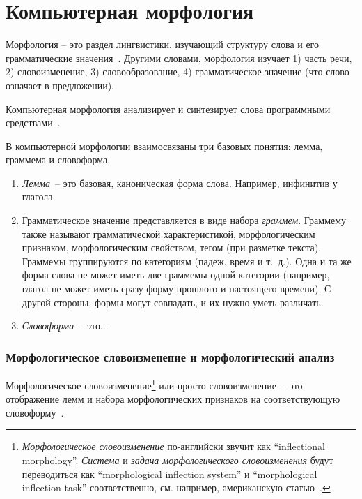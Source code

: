 \section{Компьютерная морфология}\label{sect_review_comp_morphology}

Морфология -- это раздел лингвистики, изучающий структуру слова и его грамматические значения~\cite{MitreninaNikolaevLando2016}. Другими словами, морфология изучает
1) часть речи,
2) словоизменение,
3) словообразование,
4) грамматическое значение (что слово означает в предложении). 

Компьютерная морфология анализирует и синтезирует слова программными средствами~\cite{MitreninaNikolaevLando2016}. 

В компьютерной морфологии взаимосвязаны три базовых понятия: лемма, граммема и словоформа.
\begin{enumerate}
    \item \emph{Лемма}~-- это базовая, каноническая форма слова. 
        Например, инфинитив у глагола.

    \item Грамматическое значение представляется в виде набора \emph{граммем}. 
        Граммему также называют грамматической характеристикой, 
          морфологическим признаком, морфологическим свойством, 
          тегом (при разметке текста). 
        Граммемы группируются по категориям (падеж, время и т.~д.). 
        Одна и та же форма слова не может иметь две граммемы одной категории 
        (например, глагол не может иметь сразу форму прошлого и настоящего времени). 
        С другой стороны, формы могут совпадать, и их нужно уметь различать. 

    \item \emph{Словоформа}~-- это... 
\end{enumerate}


\subsubsection{Морфологическое словоизменение и морфологический анализ}

Морфологическое словоизменение\footnote{%
    \emph{Морфологическое словоизменение} по-английски звучит как
    ``inflectional morphology''. 
    \emph{Система} и \emph{задача морфологического словоизменения} 
    будут переводиться как 
    ``morphological inflection system'' и ``morphological inflection task'' соответственно, 
    см. например, американскую статью~\cite{King2020seq2seqRussianMA}.
} или просто словоизменение~--
это отображение лемм и набора морфологических признаков 
на соответствующую словоформу~\cite[2821]{Cruz-Anastasopoulos-Stump2020Chatino}.

